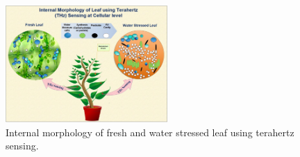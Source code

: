 \documentclass[journal,article,submit,moreauthors,pdftex]{Definitions/mdpi}
\renewcommand{\^}{\hat}  %
\begin{document}
\begin{figure}[h!]
	\centering
	\includegraphics[width=0.55\textwidth]{TerahertzSensing5R.jpg}
	\caption{Internal morphology of fresh and water stressed leaf using terahertz sensing.}
	\label{fig:TerahertzSensing1}
\end{figure}
%


\end{document}
